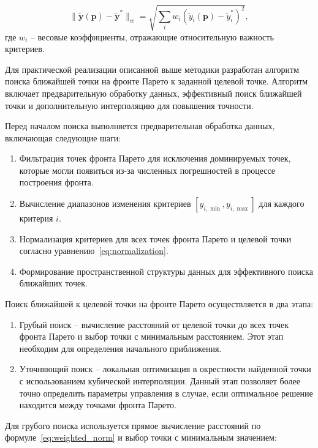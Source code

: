 \begin{equation}\label{eq:weighted_norm}
	\|\mathbf{\tilde{y}}(\mathbf{p}) - \mathbf{\tilde{y}}^*\|_w = \sqrt{\sum_{i} w_i (\tilde{y}_i(\mathbf{p}) - \tilde{y}_i^*)^2},
\end{equation}
где $w_i$ -- весовые коэффициенты, отражающие относительную важность критериев.

Для практической реализации описанной выше методики разработан алгоритм поиска ближайшей точки
на фронте Парето к заданной целевой точке. Алгоритм включает предварительную обработку данных,
эффективный поиск ближайшей точки и дополнительную интерполяцию для повышения точности.

Перед началом поиска выполняется предварительная обработка данных, включающая следующие шаги:
\begin{enumerate}
	\item Фильтрация точек фронта Парето для исключения доминируемых точек, которые
	      могли появиться из-за численных погрешностей в процессе построения фронта.

	\item Вычисление диапазонов изменения критериев $[y_{i,\min}, y_{i,\max}]$ для каждого критерия $i$.
	\item Нормализация критериев для всех точек фронта Парето и целевой точки согласно уравнению~\eqref{eq:normalization}.
	\item Формирование пространственной структуры данных для эффективного поиска ближайших точек.
\end{enumerate}

Поиск ближайшей к целевой точки на фронте Парето осуществляется в два этапа:

\begin{enumerate}
	\item Грубый поиск -- вычисление расстояний от целевой точки до всех точек фронта Парето
	      и выбор точки с минимальным расстоянием. Этот этап необходим для определения начального приближения.
	\item Уточняющий поиск -- локальная оптимизация в окрестности найденной точки с использованием
	      кубической интерполяции. Данный этап позволяет более точно определить параметры управления в
	      случае, если оптимальное решение находится между точками фронта Парето.
\end{enumerate}

Для грубого поиска используется прямое вычисление расстояний по формуле~\eqref{eq:weighted_norm} и выбор точки с минимальным значением:

